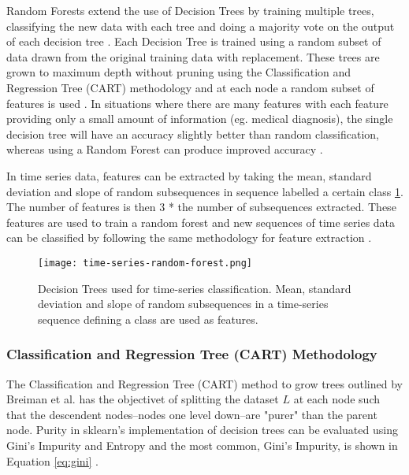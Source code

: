 Random Forests extend the use of Decision Trees by training multiple trees, classifying the new data with each tree and doing a majority vote on the output of each decision tree \cite{breimanRandomForests2001}. Each Decision Tree is trained using a random subset of data drawn from the original training data with replacement. These trees are grown to maximum depth without pruning using the Classification and Regression Tree (CART) methodology and at each node a random subset of features is used \cite{breimanRandomForests2001}. In situations where there are many features with each feature providing only a small amount of information (eg. medical diagnosis), the single decision tree will have an accuracy slightly better than random classification, whereas using a Random Forest can produce improved accuracy \cite{breimanRandomForests2001}.

In time series data, features can be extracted by taking the mean, standard deviation and slope of random subsequences in sequence labelled a certain class \ref{fig:time-series-rf}. The number of features is then 3 * the number of subsequences extracted. These features are used to train a random forest and new sequences of time series data can be classified by following the same methodology for feature extraction \cite{faouziTimeSeriesClassification2024}.

\begin{figure}[ht]
    \centering
    \texttt{[image: time-series-random-forest.png]}
    \caption{Decision Trees used for time-series classification. Mean, standard deviation and slope of random subsequences in a time-series sequence defining a class are used as features. \cite{faouziTimeSeriesClassification2024}}
    \label{fig:time-series-rf}
\end{figure}


\subsubsection{Classification and Regression Tree (CART) Methodology}
The Classification and Regression Tree (CART) method to grow trees outlined by Breiman et al. has the objectivet of splitting the dataset $L$ at each node such that the descendent nodes--nodes one level down--are "purer" than the parent node. Purity in sklearn's implementation of decision trees can be evaluated using Gini's Impurity and Entropy \cite{10DecisionTrees} and the most common, Gini's Impurity, is shown in Equation \ref{eq:gini} \cite{10DecisionTrees}.

